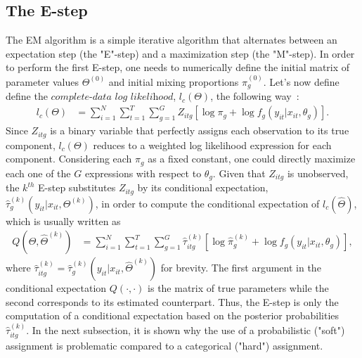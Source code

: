 \documentclass[11pt,letter]{article}
\begin{document}
\subsection{The E-step}
The EM algorithm is a simple iterative algorithm that alternates between an expectation step (the "E"-step) and a maximization step (the "M"-step). In order to perform the first E-step, one needs to numerically define the initial matrix of parameter values $\Theta^{(0)}$ and initial mixing proportions $\pi_g^{(0)}$. Let's now define define the $\textit{complete-data log likelihood}$, $l_c(\Theta)$, the following way~:
\begin{align} \label{eqn:6}
l_c(\Theta) &= \sum_{i=1}^N \sum_{t=1}^T \sum_{g=1}^G Z_{itg}[\log\pi_g + \log f_g(y_{it}|x_{it},\theta_g)].
\end{align}
Since $Z_{itg}$ is a binary variable that perfectly assigns each observation to its true component, $l_c(\Theta)$ reduces to a weighted log likelihood expression for each component. Considering each $\pi_g$ as a fixed constant, one could directly maximize each one of the $G$ expressions with respect to $\theta_g$. Given that $Z_{itg}$ is unobserved, the $k^{th}$ E-step substitutes $Z_{itg}$ by its conditional expectation, $\hat{\tau}^{(k)}_{g}(y_{it}|x_{it},\Theta^{(k)})$, in order to compute the conditional expectation of $l_c(\hat{\Theta})$, which is usually written as
\begin{align} \label{eqn:7}
Q(\Theta,\hat{\Theta}^{(k)}) &= \sum_{i=1}^N \sum_{t=1}^T \sum_{g=1}^G \hat{\tau}^{(k)}_{itg}[\log\hat{\pi}^{(k)}_g + \log f_g(y_{it}|x_{it},\theta_g)],
\end{align}
where $\hat{\tau}^{(k)}_{itg} = \hat{\tau}^{(k)}_{g}(y_{it}|x_{it},\hat{\Theta}^{(k)})$ for brevity. The first argument in the conditional expectation $Q(\cdot,\cdot)$ is the matrix of true parameters while the second corresponds to its estimated counterpart. Thus, the E-step is only the computation of a conditional expectation based on the posterior probabilities $\hat{\tau}^{(k)}_{itg}$. In the next subsection, it is shown why the use of a probabilistic ("soft") assignment is problematic compared to a categorical ("hard") assignment.
\end{document}
